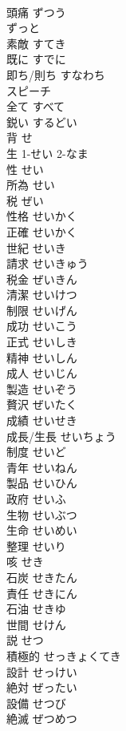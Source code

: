 \documentclass[8pt]{extreport}
\begin{document}
\begin{CJK}{UTF8}{min}
\\	頭痛	ずつう	
\\	ずっと		
\\	素敵	すてき	
\\	既に	すでに	
\\	即ち/則ち	すなわち	
\\	スピーチ		
\\	全て	すべて	
\\	鋭い	するどい	
\\	背	せ	
\\	生	1-せい 2-なま	
\\	性	せい	
\\	所為	せい	
\\	税	ぜい	
\\	性格	せいかく	
\\	正確	せいかく	
\\	世紀	せいき	
\\	請求	せいきゅう	
\\	税金	ぜいきん	
\\	清潔	せいけつ	
\\	制限	せいげん	
\\	成功	せいこう	
\\	正式	せいしき	
\\	精神	せいしん	
\\	成人	せいじん	
\\	製造	せいぞう	
\\	贅沢	ぜいたく	
\\	成績	せいせき	
\\	成長/生長	せいちょう	
\\	制度	せいど	
\\	青年	せいねん	
\\	製品	せいひん	
\\	政府	せいふ	
\\	生物	せいぶつ	
\\	生命	せいめい	
\\	整理	せいり	
\\	咳	せき	
\\	石炭	せきたん	
\\	責任	せきにん	
\\	石油	せきゆ	
\\	世間	せけん	
\\	説	せつ	
\\	積極的	せっきょくてき	
\\	設計	せっけい	
\\	絶対	ぜったい	
\\	設備	せつび	
\\	絶滅	ぜつめつ	

\end{CJK}
\end{document}
